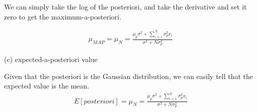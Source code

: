 \documentclass[11pt]{article}
\theoremstyle{definition}
\begin{document}
We can simply take the log of the posteriori, and take the derivative and set it zero to get the maximum-a-posteriori.


\begin{eqnarray}
\mu_{MAP} = \mu_N = \frac{\mu_p\sigma^2 + \sum_{i=1}^{N} \sigma_p^2x_i}{\sigma^2 + N\sigma_p^2} \nonumber
\end{eqnarray}

(c) expected-a-posteriori value

Given that the posteriori is the Gaussian distribution, we can easily tell that the expected value is the mean. 
\begin{eqnarray}
E[posteriori] = \mu_N = \frac{\mu_p\sigma^2 + \sum_{i=1}^{N} \sigma_p^2x_i}{\sigma^2 + N\sigma_p^2} \nonumber
\end{eqnarray}
\end{document}
